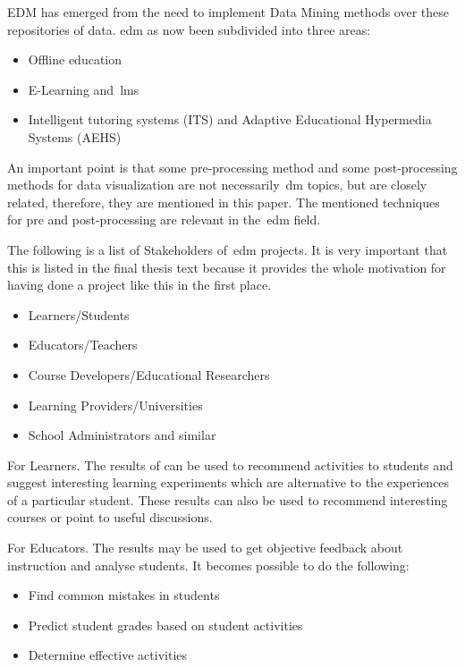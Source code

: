 EDM has emerged from the need to implement Data Mining methods over these
repositories of data. \gls{edm} as now been subdivided into three areas:

\begin{itemize}
    \item Offline education
    \item E-Learning and~\gls{lms}
    \item Intelligent tutoring systems (ITS) and Adaptive Educational
        Hypermedia Systems (AEHS)
\end{itemize}

An important point is that some pre-processing method and some post-processing
methods for data visualization are not necessarily~\gls{dm} topics, but are
closely related, therefore, they are mentioned in this paper. The mentioned
techniques for pre and post-processing are relevant in the~\gls{edm} field.

The following is a list of Stakeholders of~\gls{edm} projects. It is very
important that this is listed in the final thesis text because it provides the
whole motivation for having done a project like this in the first place.

\begin{itemize}
    \item Learners/Students
    \item Educators/Teachers
    \item Course Developers/Educational Researchers
    \item Learning Providers/Universities
    \item School Administrators and similar
\end{itemize}

For Learners. The results of can be used to recommend activities to students
and suggest interesting learning experiments which are alternative to the
experiences of a particular student. These results can also be used to
recommend interesting courses or point to useful discussions.

For Educators. The results may be used to get objective feedback about
instruction and analyse students. It becomes possible to do the following:

\begin{itemize}
    \item Find common mistakes in students
    \item Predict student grades based on student activities
    \item Determine effective activities
\end{itemize}

